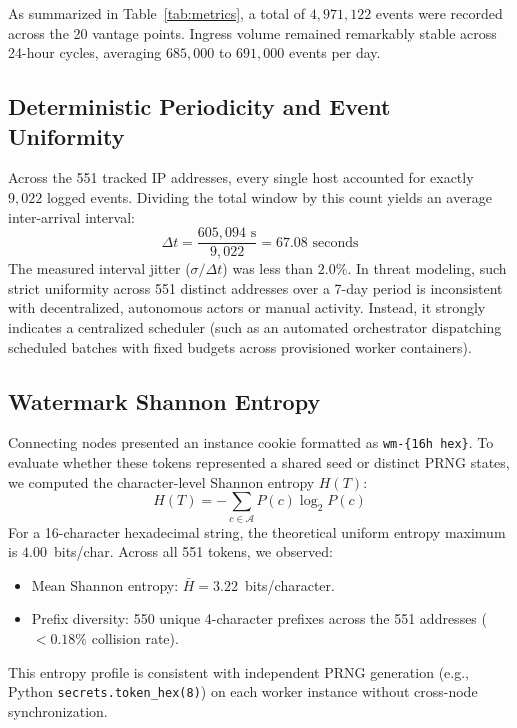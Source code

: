 \documentclass[10pt,twocolumn]{article}
\begin{document}
As summarized in Table~\ref{tab:metrics}, a total of $4,971,122$ events were recorded across the 20 vantage points. Ingress volume remained remarkably stable across 24-hour cycles, averaging $685,000$ to $691,000$ events per day.

\subsection{Deterministic Periodicity and Event Uniformity}
Across the 551 tracked IP addresses, every single host accounted for exactly $9,022$ logged events. Dividing the total window by this count yields an average inter-arrival interval:
\begin{equation}
\Delta t = \frac{605,094\text{ s}}{9,022} = 67.08\text{ seconds}
\end{equation}
The measured interval jitter ($\sigma / \Delta t$) was less than $2.0\%$. In threat modeling, such strict uniformity across 551 distinct addresses over a 7-day period is inconsistent with decentralized, autonomous actors or manual activity. Instead, it strongly indicates a centralized scheduler (such as an automated orchestrator dispatching scheduled batches with fixed budgets across provisioned worker containers).

\subsection{Watermark Shannon Entropy}
Connecting nodes presented an instance cookie formatted as \texttt{wm-\{16h hex\}}. To evaluate whether these tokens represented a shared seed or distinct PRNG states, we computed the character-level Shannon entropy $H(T)$:
\begin{equation}
H(T) = -\sum_{c \in \mathcal{A}} P(c) \log_2 P(c)
\end{equation}
For a 16-character hexadecimal string, the theoretical uniform entropy maximum is $4.00$~bits/char. Across all 551 tokens, we observed:
\begin{itemize}
    \item Mean Shannon entropy: $\bar{H} = 3.22$~bits/character.
    \item Prefix diversity: 550 unique 4-character prefixes across the 551 addresses ($< 0.18\%$ collision rate).
\end{itemize}
This entropy profile is consistent with independent PRNG generation (e.g., Python \texttt{secrets.token\_hex(8)}) on each worker instance without cross-node synchronization.
\end{document}

